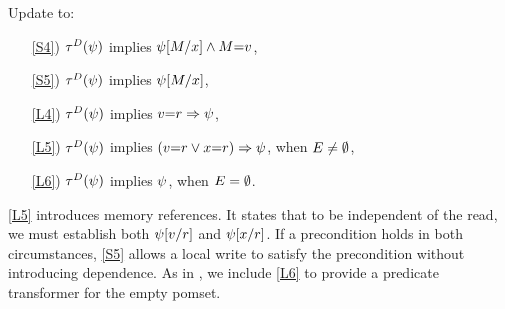 
\begin{definition}[\xLIR]
  \label{def:pomsets-lir}
  Update  to: %
  \begin{enumerate}
  \item[\ref{S4})]
    $\aTr{\bEvs}{\bForm}$ implies $\psi[M/x]\land M{=}v$,
  \item[\ref{S5})]
    $\aTr{\cEvs}{\bForm}$ implies $\psi[M/x]$,
  \item[\ref{L4})]
    $\aTr{\bEvs}{\bForm}$ implies $v{=}r\Rightarrow\psi$, 
  \item[\ref{L5})]
    $\aTr{\cEvs}{\bForm}$ implies
    $(v{=}r\lor x{=}r)\Rightarrow\psi$, when $E\neq\emptyset$,
  \item[\ref{L6})] 
    $\aTr{\dEvs}{\bForm}$ implies $\psi$, when $E=\emptyset$.
  \end{enumerate}
\end{definition}

\ref{L5} introduces memory references.  It states that to be independent of
the read, we must establish both $\psi[v/r]$ and $\psi[x/r]$.
If a precondition holds in both circumstances, \ref{S5} allows a local write
to satisfy the precondition without introducing dependence.
As in , we include \ref{L6} to provide a predicate
transformer for the empty pomset.


